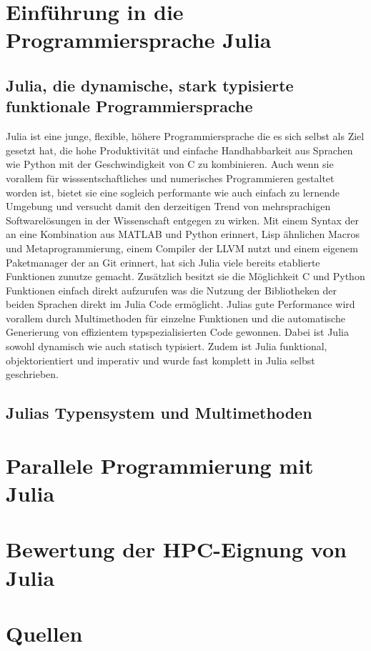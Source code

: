 \documentclass[proseminar,german,utf8]{zihpub}
\begin{document}
\section{Einführung in die Programmiersprache Julia}
\subsection{Julia, die dynamische, stark typisierte funktionale Programmiersprache}
Julia ist eine junge, flexible, höhere Programmiersprache die es sich selbst als Ziel gesetzt hat, die hohe Produktivität und einfache Handhabbarkeit aus Sprachen wie Python mit der Geschwindigkeit von C zu kombinieren. Auch wenn sie vorallem für wisssentschaftliches und numerisches Programmieren gestaltet worden ist, bietet sie eine sogleich performante wie auch einfach zu lernende Umgebung und versucht damit den derzeitigen Trend von mehrsprachigen Softwarelösungen in der Wissenschaft entgegen zu wirken. Mit einem Syntax der an eine Kombination aus MATLAB und Python erinnert, Lisp ähnlichen Macros und Metaprogrammierung, einem Compiler der LLVM nutzt und einem eigenem Paketmanager der an Git erinnert, hat sich Julia viele bereits etablierte Funktionen zunutze gemacht. Zusätzlich besitzt sie die Möglichkeit C und Python Funktionen einfach direkt aufzurufen was die Nutzung der Bibliotheken der beiden Sprachen direkt im Julia Code ermöglicht. Julias gute Performance wird vorallem durch Multimethoden für einzelne Funktionen und die automatische Generierung von effizientem typspezialisierten Code gewonnen. Dabei ist Julia sowohl dynamisch wie auch statisch typisiert. Zudem ist Julia funktional, objektorientiert und imperativ und wurde fast komplett in Julia selbst geschrieben.
\subsection{Julias Typensystem und Multimethoden}

\section{Parallele Programmierung mit Julia}
\section{Bewertung der HPC-Eignung von Julia}
\section{Quellen}
\end{document}

